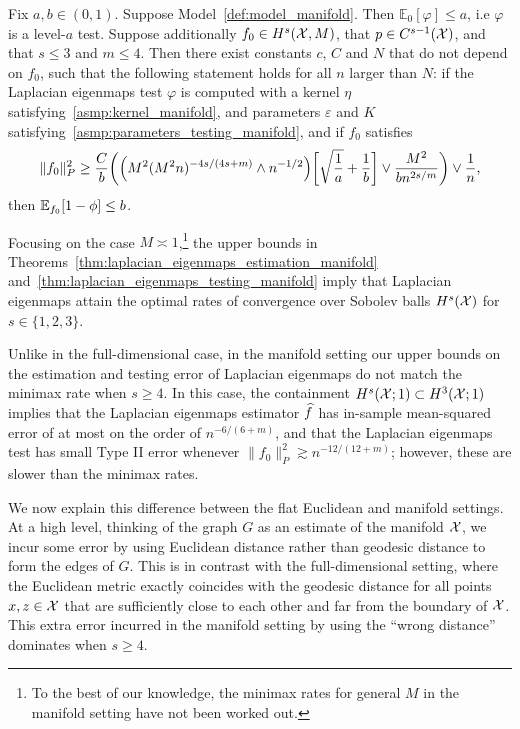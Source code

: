 \begin{theorem}
	\label{thm:laplacian_eigenmaps_testing_manifold}
	Fix $a,b \in (0,1)$. Suppose Model~\ref{def:model_manifold}. Then $\mathbb{E}_0[\varphi] \leq a$, i.e $\varphi$ is a level-$a$ test. Suppose additionally $f_0 \in H^s(\mathcal{X},M)$, that $p \in C^{s-1}(\mathcal{X})$, and that $s \leq 3$ and $m \leq 4$. Then there exist constants $c$, $C$ and $N$ that do not depend on $f_0$, such that the following statement holds for all $n$ larger than $N$: if the Laplacian eigenmaps test $\varphi$ is computed with a kernel $\eta$ satisfying~\ref{asmp:kernel_manifold}, and parameters $\varepsilon$ and $K$ satisfying~\ref{asmp:parameters_testing_manifold}, and if $f_0$ satisfies
	\begin{equation}
	\label{eqn:laplacian_eigenmaps_testing_criticalradius_manifold}
	\|f_0\|_P^2 \geq \frac{C}{b}\biggl(\Bigl(M^2(M^2n)^{-4s/(4s + m) } \wedge n^{-1/2}\Bigr)\biggl[\sqrt{\frac{1}{a}} + \frac{1}{b}\biggr] \vee \frac{M^2}{b n^{2s/m}} \biggr) \vee \frac{1}{n},
	\end{equation}
	then $\mathbb{E}_{f_0}[1 - \phi] \leq b$.
\end{theorem}
Focusing on the case $M \asymp 1$,\footnote{To the best of our knowledge, the minimax rates for general $M$ in the manifold setting have not been worked out.} the upper bounds in Theorems~\ref{thm:laplacian_eigenmaps_estimation_manifold} and~\ref{thm:laplacian_eigenmaps_testing_manifold} imply that Laplacian eigenmaps attain the optimal rates of convergence over Sobolev balls $H^s(\mathcal{X})$ for $s \in \{1,2,3\}$. 

Unlike in the full-dimensional case, in the manifold setting our upper bounds on the estimation and testing error of Laplacian eigenmaps do not match the minimax rate when $s \geq 4$.  In this case, the containment $H^s(\mathcal{X};1) \subset H^{3}(\mathcal{X};1)$ implies that the Laplacian eigenmaps estimator $\widehat{f}$ has in-sample mean-squared error of at most on the order of $n^{-6/(6 + m)}$, and that the Laplacian eigenmaps test has small Type II error whenever $\|f_0\|_P^2 \gtrsim n^{-12/(12 + m)}$; however, these are slower than the minimax rates. 

We now explain this difference between the flat Euclidean and manifold settings. At a high level, thinking of the graph $G$ as an estimate of the manifold $\mathcal{X}$, we incur some error by using Euclidean distance rather than geodesic distance to form the edges of $G$. This is in contrast with the full-dimensional setting, where the Euclidean metric exactly coincides with the geodesic distance for all points $x,z \in \mathcal{X}$ that are sufficiently close to each other and far from the boundary of $\mathcal{X}$. This extra error incurred in the manifold setting by using the ``wrong distance'' dominates when $s \geq 4$. 

